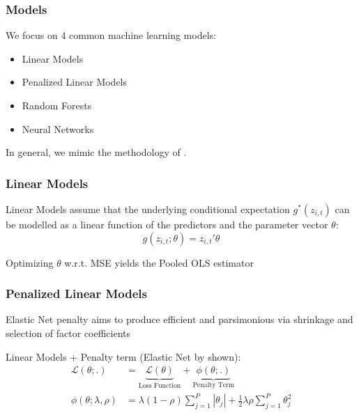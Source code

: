 \documentclass[aspectratio=169]{beamer}
\begin{document}

\begin{frame}
\frametitle{Models}
We focus on 4 common machine learning models:
\begin{itemize}
	\item Linear Models
	\item Penalized Linear Models
	\item Random Forests
	\item Neural Networks
\end{itemize}

In general, we mimic the methodology of \cite{gu_empirical_2018}.
\end{frame}

\begin{frame}
\frametitle{Linear Models}
Linear Models assume that the underlying conditional expectation \( g^*(z_{i, t}) \) can be modelled as a linear function of the predictors and the parameter vector \( \theta \):
	\begin{equation}
	g(z_{i, t};\theta) = z_{i, t}' \theta
	\end{equation}
	
Optimizing $\theta$ w.r.t. MSE yields the Pooled OLS estimator
\end{frame}


\begin{frame}
\frametitle{Penalized Linear Models}

Elastic Net penalty aims to produce efficient and parsimonious via shrinkage and selection of factor coefficients

Linear Models + Penalty term (Elastic Net by \cite{zou_regularization_2005} shown):
	\begin{align}
	\mathcal{L(\theta;.)} &= 
		\underset{\text{Loss Function}}{\underbrace{\mathcal{L(\theta)}}} + 
		\underset{\text{Penalty Term}}{\underbrace{\phi(\theta;.)}} \\
	\phi(\theta;\lambda,\rho) &= 
		\lambda(1-\rho) \sum_{j = 1}^{P}|\theta_j| +
		\frac{1}{2} \lambda \rho \sum_{j = 1}^{P}\theta_j^2
	\end{align}
\end{frame}

\end{document}
